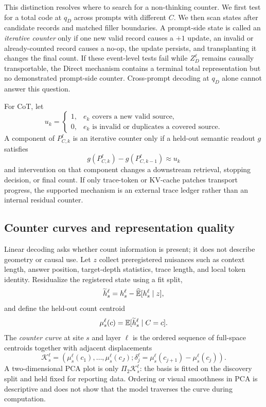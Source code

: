 This distinction resolves where to search for a non-thinking counter. We first test for a total code at \(q_D\) across prompts with different \(C\). We then scan states after candidate records and matched filler boundaries. A prompt-side state is called an \emph{iterative counter} only if one new valid record causes a \(+1\) update, an invalid or already-counted record causes a no-op, the update persists, and transplanting it changes the final count. If these event-level tests fail while \(Z_D^\ell\) remains causally transportable, the Direct mechanism contains a terminal total representation but no demonstrated prompt-side counter. Cross-prompt decoding at \(q_D\) alone cannot answer this question.

For CoT, let
\[
u_k=
\begin{cases}
1,& e_k\text{ covers a new valid source},\\
0,& e_k\text{ is invalid or duplicates a covered source}.
\end{cases}
\]
A component of \(P_{C,k}^\ell\) is an iterative counter only if a held-out semantic readout \(g\) satisfies
\begin{equation}
g(P_{C,k}^\ell)-g(P_{C,k-1}^\ell)\approx u_k
\label{eq:counter-update}
\end{equation}
and intervention on that component changes a downstream retrieval, stopping decision, or final count. If only trace-token or KV-cache patches transport progress, the supported mechanism is an external trace ledger rather than an internal residual counter.

\subsection{Counter curves and representation quality}

Linear decoding asks whether count information is present; it does not describe geometry or causal use. Let \(z\) collect preregistered nuisances such as context length, answer position, target-depth statistics, trace length, and local token identity. Residualize the registered state using a fit split,
\[
\widetilde h_s^\ell
=h_s^\ell-\widehat{\mathbb{E}}[h_s^\ell\mid z],
\]
and define the held-out count centroid
\begin{equation}
\mu_s^\ell(c)=\mathbb{E}[\widetilde h_s^\ell\mid C=c].
\label{eq:count-centroid}
\end{equation}
The \emph{counter curve} at site \(s\) and layer \(\ell\) is the ordered sequence of full-space centroids together with adjacent displacements
\begin{equation}
\mathcal K_s^\ell=
\left(
\mu_s^\ell(c_1),\ldots,\mu_s^\ell(c_J);
\delta_j^\ell=\mu_s^\ell(c_{j+1})-\mu_s^\ell(c_j)
\right).
\label{eq:counter-curve}
\end{equation}
A two-dimensional PCA plot is only \(\Pi_2\mathcal K_s^\ell\): the basis is fitted on the discovery split and held fixed for reporting data. Ordering or visual smoothness in PCA is descriptive and does not show that the model traverses the curve during computation.

